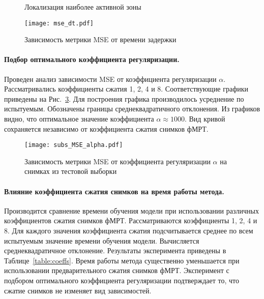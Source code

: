 \documentclass[a4paper, 12pt]{extarticle}
\begin{document}
\begin{figure}[h!]
	\centering
	\hfill
	\hfill
	\caption{Локализация наиболее активной зоны}
	\label{fig:local}
\end{figure}

\begin{figure}[h!]
	\centering
	\texttt{[image: mse\_dt.pdf]}
	\caption{Зависимость метрики MSE от времени задержки}
	\label{fig:mse-dt}
\end{figure}

\paragraph*{Подбор оптимального коэффициента регуляризации.}

Проведен анализ зависимости MSE от коэффициента регуляризации $\alpha$.
Рассматривались коэффициенты сжатия 1, 2, 4 и 8.
Соответствующие графики приведены на Рис.~\ref{fig:mse-alpha}.
Для построения графика производилось усреднение по испытуемым.
Обозначены границы среднеквадратичного отклонения.
Из графиков видно, что оптимальное значение коэффициента $\alpha \approx 1000$.
Вид кривой сохраняется независимо от коэффициента сжатия снимков фМРТ.

\begin{figure}[h!]
	\centering
	\texttt{[image: subs\_MSE\_alpha.pdf]}
	\caption{Зависимость метрики MSE от коэффициента регуляризации $\alpha$ на снимках из тестовой выборки}
	\label{fig:mse-alpha}
\end{figure}

\paragraph*{Влияние коэффициента сжатия снимков на время работы метода.}

Производится сравнение времени обучения модели при использовании различных
коэффициентов сжатия снимков фМРТ. Рассматриваются коэффициенты 1, 2, 4 и 8.
Для каждого значения коэффициента сжатия подсчитывается среднее по всем испытуемым
значение времени обучения модели. Вычисляется среднеквадратичное отклонение.
Результаты эксперимента приведены в Таблице~\ref{table:coeffs}.
Время работы метода существенно уменьшается при использовании
предварительного сжатия снимков фМРТ. 
Эксперимент с подбором оптимального коэффициента регуляризации
подтверждает то, что сжатие снимков не изменяет вид зависимостей.
\end{document}
